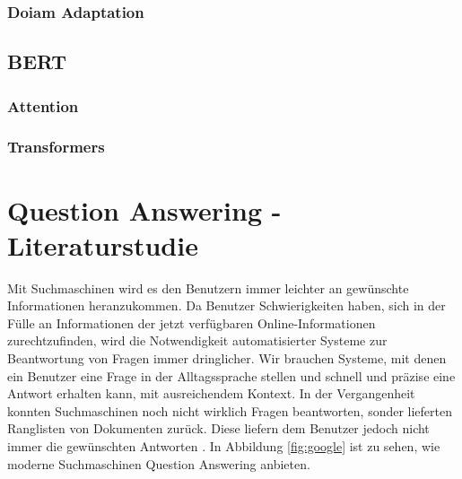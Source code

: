 \documentclass[
        ngerman,
        paper=a4,
        numbers=noendperiod,
]{scrreprt}
\begin{document}
\subsection{Doiam Adaptation}



\section{BERT}
\subsection{Attention}
\subsection{Transformers}






\chapter{Question Answering - Literaturstudie} 


    
Mit Suchmaschinen wird es den Benutzern immer leichter an gewünschte Informationen heranzukommen. Da Benutzer Schwierigkeiten haben, sich in der Fülle an Informationen der jetzt verfügbaren Online-Informationen zurechtzufinden, wird die Notwendigkeit automatisierter Systeme zur Beantwortung von Fragen immer dringlicher. Wir brauchen Systeme, mit denen ein Benutzer eine Frage in der Alltagssprache stellen und schnell und präzise eine Antwort erhalten kann, mit ausreichendem Kontext. In der Vergangenheit konnten Suchmaschinen noch nicht wirklich Fragen beantworten, sonder lieferten Ranglisten von Dokumenten zurück. Diese liefern dem Benutzer jedoch nicht immer die gewünschten Antworten \citep[S. 275]{Hirschman2001NaturalHere}. In Abbildung \ref{fig:google} ist zu sehen, wie moderne Suchmaschinen Question Answering anbieten.
\end{document}
